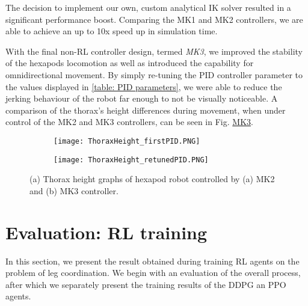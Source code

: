 The decision to implement our own, custom analytical IK solver resulted in a significant performance boost.
Comparing the MK1 and MK2 controllers, we are able to achieve an up to 10x speed up in simulation time.

With the final non-RL controller design, termed \textit{MK3}, we improved the stability of the hexapods locomotion as well as introduced the capability for omnidirectional movement.
By simply re-tuning the PID controller parameter to the values displayed in \ref{table: PID parameters}, we were able to reduce the jerking behaviour of the robot far enough to not be visually noticeable.
A comparison of the thorax's height differences during movement, when under control of the MK2 and MK3 controllers, can be seen in Fig. \hyperref[vid: MK1]{MK3}.

\begin{figure}[h]
	\begin{subfigure}{\textwidth} %
		\centering
		\texttt{[image: ThoraxHeight\_firstPID.PNG]}  %
		\caption{}
		\label{figure: Thorax Height graph, bad tuning}
	\end{subfigure}
	
	\begin{subfigure}{\textwidth}
		\centering
		\texttt{[image: ThoraxHeight\_retunedPID.PNG]}   %
		\caption{}
		\label{figure: Thorax height graph, re-tuning}
	\end{subfigure}
	\caption[Thorax height graphs]{(a) Thorax height graphs of hexapod robot controlled by (a) MK2 and (b) MK3 controller.}
	\label{figure: Thorax height graphs}
\end{figure}



\section{Evaluation: RL training}
In this section, we present the result obtained during training RL agents on the problem of leg coordination.
We begin with an evaluation of the overall process, after which we separately present the training results of the DDPG an PPO agents.


